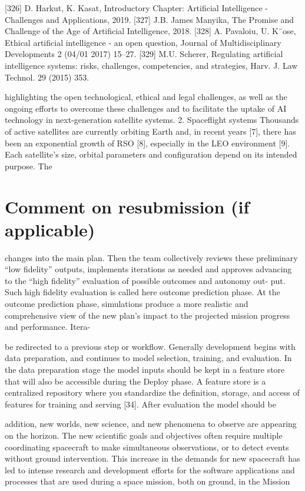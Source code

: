 \documentclass[a4paper,12pt]{article}
\begin{document}
[326] D. Harkut, K. Kasat, Introductory Chapter: Artificial Intelligence - Challenges and 
Applications, 2019. 
[327] J.B. James Manyika, The Promise and Challenge of the Age of Artificial 
Intelligence, 2018. 
[328] A. Pavaloiu, U. K¨ose, Ethical artificial intelligence - an open question, Journal of 
Multidisciplinary Developments 2 (04/01 2017) 15–27. 
[329] M.U. Scherer, Regulating artificial intelligence systems: risks, challenges, 
competencies, and strategies, Harv. J. Law Technol. 29 (2015) 353.

highlighting the open technological, ethical and legal challenges, as well 
as the ongoing efforts to overcome these challenges and to facilitate the 
uptake of AI technology in next-generation satellite systems. 
2. Spaceflight systems 
Thousands of active satellites are currently orbiting Earth and, in 
recent years [7], there has been an exponential growth of RSO [8], 
especially in the LEO environment [9]. Each satellite’s size, orbital 
parameters and configuration depend on its intended purpose. The

\section{Comment on resubmission (if applicable)}

changes into the main plan.
Then the team collectively
reviews these preliminary “low ﬁdelity” outputs, implements
iterations as needed and approves advancing to the “high
ﬁdelity” evaluation of possible outcomes and autonomy out-
put.
Such high ﬁdelity evaluation is called here outcome
prediction phase.
At the outcome prediction phase, simulations produce a more
realistic and comprehensive view of the new plan’s impact
to the projected mission progress and performance. Itera-

be redirected to a previous step or workﬂow. Generally development begins with data preparation, and continues to
model selection, training, and evaluation. In the data preparation stage the model inputs should be kept in a feature store
that will also be accessible during the Deploy phase. A feature store is a centralized repository where you standardize
the deﬁnition, storage, and access of features for training and serving [34]. After evaluation the model should be

addition, new worlds, new science, and new phenomena to observe are appearing 
on the horizon. The new scientific goals and objectives often require multiple 
coordinating spacecraft to make simultaneous observations, or to detect events 
without ground intervention. This increase in the demands for new spacecraft has 
led to intense research and development efforts for the software applications and 
processes that are used during a space mission, both on ground, in the Mission
\end{document}
